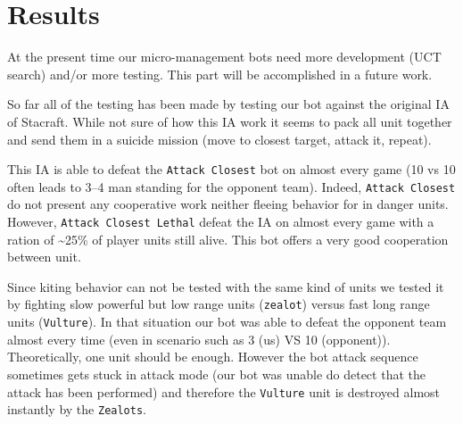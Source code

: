 \section{Results }

At the present time our micro-management bots need more development (UCT search) and/or more testing. This part will be accomplished in a future work.

So far all of the testing has been made by testing our bot against the original IA of Stacraft. While not sure of how this IA work it seems to pack all unit together and send them in a suicide mission (move to closest target, attack it, repeat). 

This IA is able to defeat the \texttt{Attack Closest} bot on almost every game (10 vs 10 often leads to 3--4 man standing for the opponent team).
Indeed, \texttt{Attack Closest} do not present any cooperative work neither fleeing behavior for in danger units. However, \texttt{Attack Closest Lethal} defeat the IA on almost every game with a ration of \textasciitilde25\% of player units still alive. This bot offers a very good cooperation between unit.

Since kiting behavior can not be tested with the same kind of units we tested it by fighting slow powerful but low range units (\texttt{zealot}) versus fast long range units (\texttt{Vulture}). 
In that situation our bot was able to defeat the opponent team almost every time (even in scenario such as 3 (us) VS 10 (opponent)). 
Theoretically, one unit should be enough. However the bot attack sequence sometimes gets stuck in attack mode (our bot was unable do detect that the attack has been performed) and therefore the \texttt{Vulture} unit is destroyed almost instantly by the \texttt{Zealots}.
